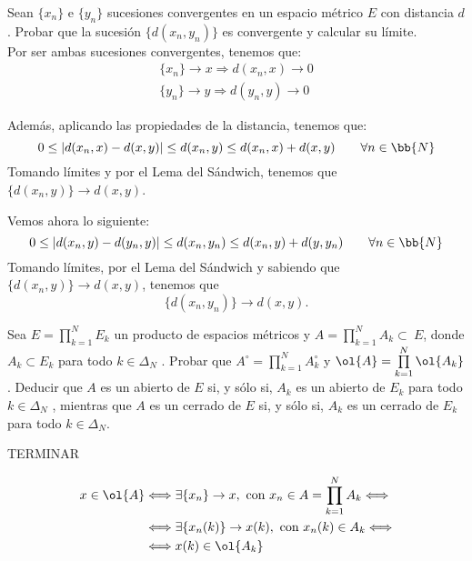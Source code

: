 \begin{ejercicio}
    Sean $\{x_n\}$ e $\{y_n\}$ sucesiones convergentes en un espacio métrico $E$ con distancia $d$. Probar que la sucesión $\{d(x_n, y_n)\}$ es convergente y calcular su límite.\\
    
    Por ser ambas sucesiones convergentes, tenemos que:
    \begin{gather*}
        \{x_n\} \to x \Longrightarrow d(x_n, x)\to 0 \\
        \{y_n\} \to y \Longrightarrow d(y_n, y)\to 0
    \end{gather*}

    Además, aplicando las propiedades de la distancia, tenemos que:
    \begin{equation*}
        0\leq |d(x_n,x)-d(x,y)|\leq d(x_n,y)\leq d(x_n,x) + d(x,y) \qquad \forall n\in \bb{N}
    \end{equation*}
    Tomando límites y por el Lema del Sándwich, tenemos que $\{d(x_n,y)\}\to d(x,y)$.

    Vemos ahora lo siguiente:
    \begin{equation*}
        0\leq |d(x_n,y)-d(y_n,y)|\leq d(x_n,y_n)\leq d(x_n,y) + d(y,y_n) \qquad \forall n\in \bb{N}
    \end{equation*}
    Tomando límites, por el Lema del Sándwich y sabiendo que $\{d(x_n,y)\}\to d(x,y)$, tenemos que $$\{d(x_n,y_n)\}\to d(x,y).$$
\end{ejercicio}


\begin{ejercicio}
    Sea $E = \prod\limits_{k=1}^N E_k$ un producto de espacios métricos y $A =\prod\limits_{k=1}^N A_k\subset~E$, donde $A_k \subset E_k$ para todo $k \in \Delta_N$ . Probar que $A^\circ =\prod\limits_{k=1}^N A_k^\circ$ y $\ol{A} =\prod\limits_{k=1}^N \ol{A_k}$. Deducir que $A$ es un abierto de $E$ si, y sólo si, $A_k$ es un abierto de $E_k$ para todo $k \in \Delta_N$ , mientras que $A$ es un cerrado de $E$ si, y sólo si, $A_k$ es un cerrado de $E_k$ para todo $k \in \Delta_N$.

    TERMINAR


    \begin{equation*}\begin{split}
        x\in \ol{A} &\Longleftrightarrow \exists \{x_n\}\to x, \text{ con }x_n\in A=\prod\limits_{k=1}^N A_k \Longleftrightarrow \\
        & \Longleftrightarrow  \exists \{x_n(k)\}\to x(k), \text{ con }x_n(k)\in A_k\Longleftrightarrow \\
        & \Longleftrightarrow x(k)\in \ol{A_k}
    \end{split}\end{equation*}
\end{ejercicio}